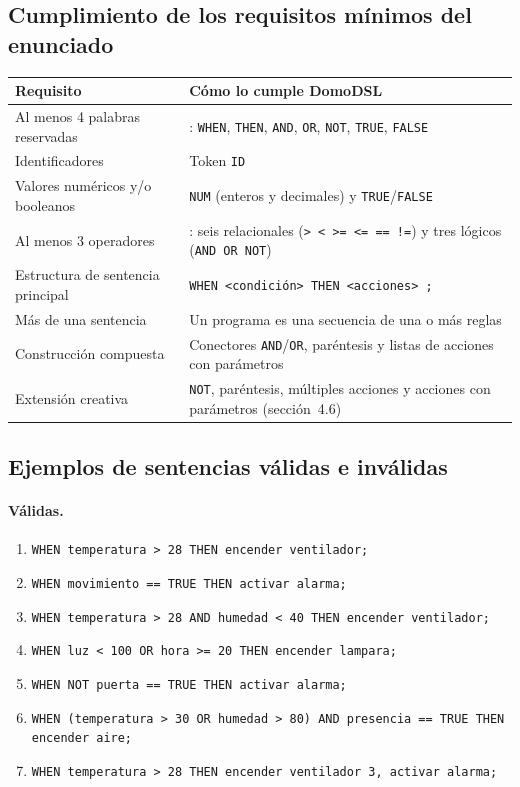 \subsection{Cumplimiento de los requisitos mínimos del enunciado}
\begin{center}\small
\begin{tabular}{@{}>{\raggedright\arraybackslash}p{5.6cm} >{\raggedright\arraybackslash}p{9.4cm}@{}}
\toprule
\textbf{Requisito} & \textbf{Cómo lo cumple DomoDSL} \\
\midrule
Al menos 4 palabras reservadas & 7: \texttt{WHEN}, \texttt{THEN}, \texttt{AND}, \texttt{OR}, \texttt{NOT}, \texttt{TRUE}, \texttt{FALSE} \\
Identificadores & Token \texttt{ID} \\
Valores numéricos y/o booleanos & \texttt{NUM} (enteros y decimales) y \texttt{TRUE}/\texttt{FALSE} \\
Al menos 3 operadores & 9: seis relacionales (\texttt{> < >= <= == !=}) y tres lógicos (\texttt{AND OR NOT}) \\
Estructura de sentencia principal & \texttt{WHEN <condición> THEN <acciones> ;} \\
Más de una sentencia & Un programa es una secuencia de una o más reglas \\
Construcción compuesta & Conectores \texttt{AND}/\texttt{OR}, paréntesis y listas de acciones con parámetros \\
Extensión creativa & \texttt{NOT}, paréntesis, múltiples acciones y acciones con parámetros (sección~4.6) \\
\bottomrule
\end{tabular}
\end{center}

\subsection{Ejemplos de sentencias válidas e inválidas}
\paragraph{Válidas.}
\begin{enumerate}[nosep]
\item \texttt{WHEN temperatura > 28 THEN encender ventilador;}
\item \texttt{WHEN movimiento == TRUE THEN activar alarma;}
\item \texttt{WHEN temperatura > 28 AND humedad < 40 THEN encender ventilador;}
\item \texttt{WHEN luz < 100 OR hora >= 20 THEN encender lampara;}
\item \texttt{WHEN NOT puerta == TRUE THEN activar alarma;}
\item \texttt{WHEN (temperatura > 30 OR humedad > 80) AND presencia == TRUE THEN encender aire;}
\item \texttt{WHEN temperatura > 28 THEN encender ventilador 3, activar alarma;}
\end{enumerate}
